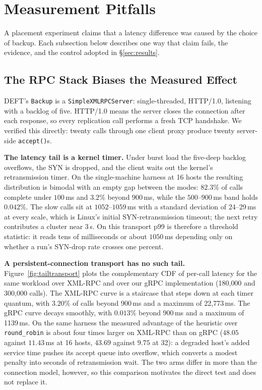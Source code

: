 \section{Measurement Pitfalls}
\label{sec:measurement}

A placement experiment claims that a latency difference was caused by the
choice of backup. Each subsection below describes one way that claim fails, the
evidence, and the control adopted in \S\ref{sec:results}.

\subsection{The RPC Stack Biases the Measured Effect}
\label{sec:p99}

DEFT's \texttt{Backup} is a \texttt{SimpleXMLRPCServer}: single-threaded,
HTTP/1.0, listening with a backlog of five. HTTP/1.0 means the server closes the
connection after each response, so every replication call performs a fresh TCP
handshake. We verified this directly: twenty calls through one client proxy
produce twenty server-side \texttt{accept()}s.

\textbf{The latency tail is a kernel timer.} Under burst load the five-deep
backlog overflows, the SYN is dropped, and the client waits out the kernel's
retransmission timer. On the single-machine harness at 16 hosts the resulting
distribution is bimodal with an empty gap between the modes: $82.3\%$ of calls
complete under $100$\,ms and $3.2\%$ beyond $900$\,ms, while the
$500$--$900$\,ms band holds $0.042\%$. The slow calls sit at
$1052$--$1059$\,ms with a standard deviation of 24--29\,ms at every scale, which
is Linux's initial SYN-retransmission timeout; the next retry contributes a
cluster near 3\,s. On this transport p99 is therefore a threshold statistic: it
reads tens of milliseconds or about $1050$\,ms depending only on whether a run's
SYN-drop rate crosses one percent.

\textbf{A persistent-connection transport has no such tail.}
Figure~\ref{fig:tailtransport} plots the complementary CDF of per-call latency
for the same workload over XML-RPC and over our gRPC implementation
(180{,}000 and 300{,}000 calls). The XML-RPC curve is a staircase that steps
down at each timer quantum, with $3.20\%$ of calls beyond 900\,ms and a maximum
of 22{,}773\,ms. The gRPC curve decays smoothly, with $0.013\%$ beyond 900\,ms
and a maximum of 1139\,ms. On the same harness the measured advantage of the
heuristic over \texttt{round\_robin} is about four times larger on XML-RPC than
on gRPC ($48.05$ against $11.43$\,ms at 16 hosts, $43.69$ against $9.75$ at 32):
a degraded host's added service time pushes its accept queue into overflow,
which converts a modest penalty into seconds of retransmission wait. The two
arms differ in more than the connection model, however, so this comparison
motivates the direct test and does not replace it.

